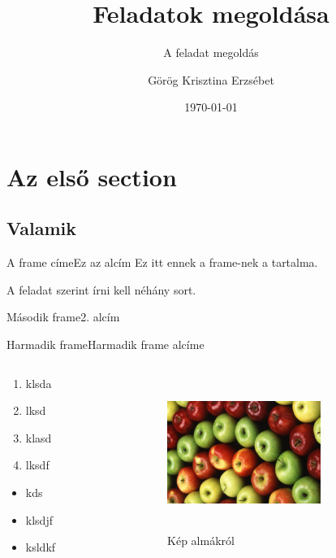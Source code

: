 \documentclass[aspectratio=169, bigger, xcolor={table}]{beamer}
\author{Görög Krisztina Erzsébet}
\title{Feladatok megoldása}
\subtitle{A feladat megoldás}
\institute{Miskolci Egyetem}
\date{\today}
\begin{document}
\maketitle
\AtBeginSection{\frame{\sectionpage}}
\AtBeginSection{\frame{%
\tableofcontents[sections={\value{section}}]}}

\section{Az első section}
\subsection{Valamik}

\begin{frame}{A frame címe}{Ez az alcím}
Ez itt ennek a frame-nek a tartalma.

A feladat szerint írni kell néhány sort.
\end{frame}

\begin{frame}[allowframebreaks]{Második frame}{2. alcím}
\hulipsum
\end{frame}

\begin{frame}{Harmadik frame}{Harmadik frame alcíme}
\begin{columns}[c]

\begin{column}{0.5\linewidth}
\begin{enumerate}
\item klsda
\item lksd
\item klasd
\item lksdf
\end{enumerate}

\begin{itemize}
\item kds
\item klsdjf
\item ksldkf
\end{itemize}
\end{column}

\begin{column}{0.5\linewidth}
\begin{figure}
\caption{Kép almákról}
\label{fig:almak}
\includegraphics[height=5cm, width=5cm, keepaspectratio]{alma}

\end{figure}
\end{column}

\end{columns}
\end{frame}
\end{document}
